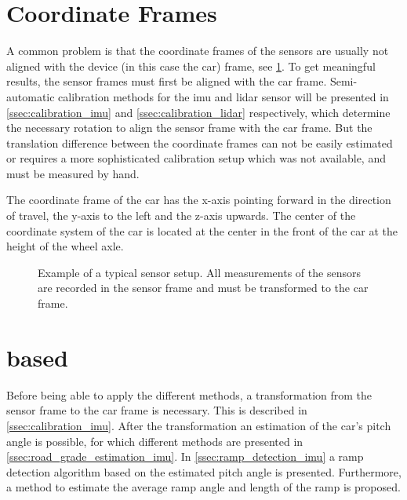 \section{Coordinate Frames}
\label{sec:coordinate_frames}
A common problem is that the coordinate frames of the sensors are usually not aligned with the device (in this case the car) frame, see \cref{fig:tikz_car_frames}.
To get meaningful results, the sensor frames must first be aligned with the car frame.
Semi-automatic calibration methods for the \gls{imu} and \gls{lidar} sensor will be presented in \cref{ssec:calibration_imu} and \cref{ssec:calibration_lidar} respectively, which determine the necessary rotation to align the sensor frame with the car frame.
But the translation difference between the coordinate frames can not be easily estimated or requires a more sophisticated calibration setup which was not available, and must be measured by hand.\par
The coordinate frame of the car has the x-axis pointing forward in the direction of travel, the y-axis to the left and the z-axis upwards.
The center of the coordinate system of the car is located at the center in the front of the car at the height of the wheel axle.
\begin{figure}[htb]
	\centering
	
	\caption[Sensor coordinate frames]{Example of a typical sensor setup. All measurements of the sensors are recorded in the sensor frame and must be transformed to the car frame.}
	\label{fig:tikz_car_frames}
\end{figure}



\section{ based}
\label{sec:methods_imu}
Before being able to apply the different methods, a transformation from the sensor frame to the car frame is necessary.
This is described in \cref{ssec:calibration_imu}.
After the transformation an estimation of the car's pitch angle is possible, for which different methods are presented in \cref{ssec:road_grade_estimation_imu}.
In \cref{ssec:ramp_detection_imu} a ramp detection algorithm based on the estimated pitch angle is presented.
Furthermore, a method to estimate the average ramp angle and length of the ramp is proposed.


